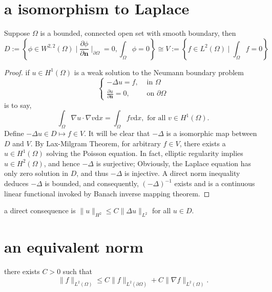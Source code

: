 \section{a isomorphism to Laplace}
\begin{theorem}
Suppose $\Omega$ is a bounded, connected open set with smooth boundary, then
\begin{equation}
D := \left\{\phi\in W^{2,2}(\Omega)\mid \frac{\partial \phi}{\partial \boldsymbol{n}}\mid_{\partial\Omega} = 0, \int_\Omega\phi=0\right\}
\cong V :=\left\{f\in L^2(\Omega)\mid \int_\Omega f = 0\right\}
\end{equation}
\end{theorem}
\begin{proof}
if $u\in H^1(\Omega)$ is a weak solution to the Neumann boundary problem 
\begin{equation*}
\left\{
\begin{array}{ll}
-\Delta u =f, & \text{ in } \Omega\\
\frac{\partial u}{\partial \boldsymbol{n}} = 0, & \text{ on } \partial\Omega
\end{array}\right.
\end{equation*}
is to say, 
\begin{equation*}
\int_\Omega\nabla u\cdot\nabla v\mathrm{d}x = \int_\Omega fv\mathrm{d}x,\text{ for all } v\in H^1(\Omega).
\end{equation*}
Define $-\Delta u\in D \mapsto f\in V$. It will be clear that $-\Delta$ is a isomorphic map between $D$ and $V$.
By Lax-Milgram Theorem, for arbitrary $f\in V$, there exists a $u\in H^1(\Omega)$ solving the Poisson equation. In fact, elliptic regularity implies $u\in H^2(\Omega)$, and hence 
$-\Delta$ is surjective; Obviously, the Laplace equation has only zero solution in $D$, and thus $-\Delta$ is injective. A direct norm inequality deduces $-\Delta$ is bounded, and consequently, $(-\Delta)^{-1}$ exists and is a continuous linear functional invoked by Banach inverse mapping theorem.
\end{proof}
\begin{example}
a direct consequence is $\|u\|_{H^2}\leq C\|\Delta u\|_{L^2}$ for all $u\in D$.
\end{example}

\section{an equivalent norm}

\begin{lemma}
	there exists $C>0$ such that 
	\[
	\|f\|_{L^2(\Omega)} \leq C\|f\|_{L^2(\partial\Omega)} + C\|\nabla f\|_{L^2(\Omega)}.
	\]
\end{lemma}

